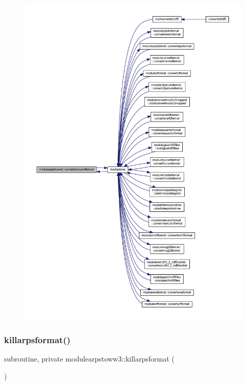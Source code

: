 \begin{figure}[H]
\begin{center}
\leavevmode
\includegraphics[width=350pt]{namespacemodulearpstoww3_a42304b111881f48406d8d939918e21ef_icgraph}
\end{center}
\end{figure}
\mbox{\label{namespacemodulearpstoww3_a2b22a4f72b20cf6f219d61b511afcad1}} 
\subsubsection{\texorpdfstring{killarpsformat()}{killarpsformat()}}
{\footnotesize\ttfamily subroutine, private modulearpstoww3\+::killarpsformat (\begin{DoxyParamCaption}{ }\end{DoxyParamCaption})\hspace{0.3cm}{\ttfamily [private]}}

